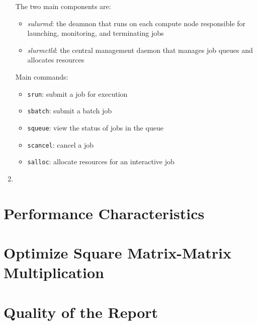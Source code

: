 \documentclass[unicode,11pt,a4paper,oneside,numbers=endperiod,openany]{scrartcl}
\begin{document}
\begin{enumerate}
    The two main components are:
    \begin{itemize}
        \item \textit{sulurmd}: the deamnon that runs on each compute node responsible for launching, monitoring, and terminating jobs
        \item \textit{slurmctld}: the central management daemon that manages job queues and allocates resources
    \end{itemize}

    Main commands:
    \begin{itemize}
        \item \texttt{srun}: submit a job for execution
        \item \texttt{sbatch}: submit a batch job
        \item \texttt{squeue}: view the status of jobs in the queue
        \item \texttt{scancel}: cancel a job
        \item \texttt{salloc}: allocate resources for an interactive job
    \end{itemize}

    \item %
    
    
\end{enumerate}




\section{Performance Characteristics }


\section{Optimize Square Matrix-Matrix Multiplication  }


\section{Quality of the Report  }
\end{document}
